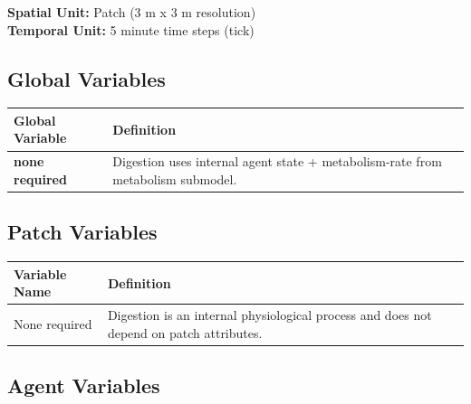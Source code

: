 \documentclass[
]{book}
\begin{document}
\textbf{Spatial Unit:} Patch (3 m x 3 m resolution)\\
\textbf{Temporal Unit:} 5 minute time steps (tick)

\subsection{Global Variables}\label{global-variables-1}

\begin{longtable}[]{@{}
  >{\raggedright\arraybackslash}p{}
  >{\raggedright\arraybackslash}p{}@{}}
\toprule\noalign{}
\begin{minipage}[b]{\linewidth}\raggedright
Global Variable
\end{minipage} & \begin{minipage}[b]{\linewidth}\raggedright
Definition
\end{minipage} \\
\midrule\noalign{}
\endhead
\bottomrule\noalign{}
\endlastfoot
\textbf{none required} & Digestion uses internal agent state + metabolism-rate from metabolism submodel. \\
\end{longtable}

\subsection{Patch Variables}\label{patch-variables-1}

\begin{longtable}[]{@{}
  >{\raggedright\arraybackslash}p{}
  >{\raggedright\arraybackslash}p{}@{}}
\toprule\noalign{}
\begin{minipage}[b]{\linewidth}\raggedright
Variable Name
\end{minipage} & \begin{minipage}[b]{\linewidth}\raggedright
Definition
\end{minipage} \\
\midrule\noalign{}
\endhead
\bottomrule\noalign{}
\endlastfoot
None required & Digestion is an internal physiological process and does not depend on patch attributes. \\
\end{longtable}

\subsection{Agent Variables}\label{agent-variables-1}
\end{document}
